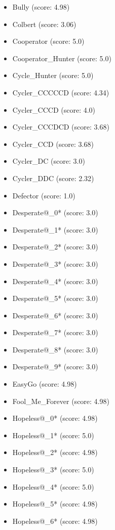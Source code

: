 \begin{appendices}
\begin{itemize}
\begin{multicols}{3}
\begin{itemize}
            \item Bully (score: 4.98)
            \item Colbert (score: 3.06)
            \item Cooperator (score: 5.0)
            \item Cooperator\_Hunter (score: 5.0)
            \item Cycle\_Hunter (score: 5.0)
            \item Cycler\_CCCCCD (score: 4.34)
            \item Cycler\_CCCD (score: 4.0)
            \item Cycler\_CCCDCD (score: 3.68)
            \item Cycler\_CCD (score: 3.68)
            \item Cycler\_DC (score: 3.0)
            \item Cycler\_DDC (score: 2.32)
            \item Defector (score: 1.0)
            \item Desperate@\_0* (score: 3.0)
            \item Desperate@\_1* (score: 3.0)
            \item Desperate@\_2* (score: 3.0)
            \item Desperate@\_3* (score: 3.0)
            \item Desperate@\_4* (score: 3.0)
            \item Desperate@\_5* (score: 3.0)
            \item Desperate@\_6* (score: 3.0)
            \item Desperate@\_7* (score: 3.0)
            \item Desperate@\_8* (score: 3.0)
            \item Desperate@\_9* (score: 3.0)
            \item EasyGo (score: 4.98)
            \item Fool\_Me\_Forever (score: 4.98)
            \item Hopeless@\_0* (score: 4.98)
            \item Hopeless@\_1* (score: 5.0)
            \item Hopeless@\_2* (score: 4.98)
            \item Hopeless@\_3* (score: 5.0)
            \item Hopeless@\_4* (score: 5.0)
            \item Hopeless@\_5* (score: 4.98)
            \item Hopeless@\_6* (score: 4.98)

\end{itemize}
\end{multicols}
\end{itemize}
\end{appendices}
